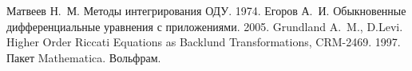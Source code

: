 \begin{thebibliography}{99}
 Матвеев Н.~М. Методы интегрирования ОДУ. 1974.
 Егоров А.~И. Обыкновенные дифференциальные уравнения с приложениями. 2005.
 Grundland A.~M., D.Levi. Higher Order Riccati Equations as Backlund Transformations, CRM-2469. 1997.
 Пакет Mathematica. Вольфрам.

\end{thebibliography}

